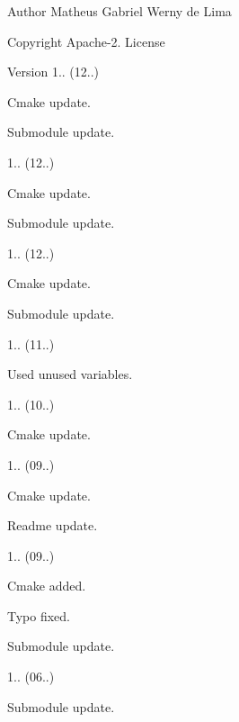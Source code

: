 \begin{DoxyAuthor}{Author}
Matheus Gabriel Werny de Lima 
\end{DoxyAuthor}
\begin{DoxyCopyright}{Copyright}
Apache-\/2. License 
\end{DoxyCopyright}
\begin{DoxyVersion}{Version}
1.. (12..)
\begin{DoxyItemize}
\item Cmake update.
\item Submodule update. 
\end{DoxyItemize}

1.. (12..)
\begin{DoxyItemize}
\item Cmake update.
\item Submodule update. 
\end{DoxyItemize}

1.. (12..)
\begin{DoxyItemize}
\item Cmake update.
\item Submodule update. 
\end{DoxyItemize}

1.. (11..)
\begin{DoxyItemize}
\item Used unused variables. 
\end{DoxyItemize}

1.. (10..)
\begin{DoxyItemize}
\item Cmake update. 
\end{DoxyItemize}

1.. (09..)
\begin{DoxyItemize}
\item Cmake update.
\item Readme update. 
\end{DoxyItemize}

1.. (09..)
\begin{DoxyItemize}
\item Cmake added.
\item Typo fixed.
\item Submodule update. 
\end{DoxyItemize}

1.. (06..)
\begin{DoxyItemize}
\item Submodule update. 
\end{DoxyItemize}


\end{DoxyVersion}
